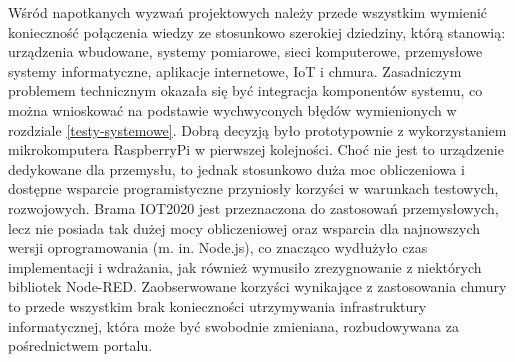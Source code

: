\documentclass[a4paper, 12pt, twoside]{article}
\begin{document}
Wśród napotkanych wyzwań projektowych należy przede wszystkim wymienić konieczność
połączenia wiedzy ze stosunkowo szerokiej dziedziny, którą stanowią: urządzenia wbudowane, 
systemy pomiarowe, sieci komputerowe, przemysłowe systemy informatyczne, aplikacje internetowe, IoT i chmura. 
Zasadniczym problemem technicznym okazała się być integracja komponentów systemu, co 
można wnioskować na podstawie wychwyconych błędów wymienionych w rozdziale 
\ref{testy-systemowe}. Dobrą decyzją było prototypownie z wykorzystaniem
mikrokomputera RaspberryPi w pierwszej kolejności. Choć nie jest to urządzenie 
dedykowane dla przemysłu, to jednak stosunkowo duża moc obliczeniowa i 
dostępne wsparcie programistyczne przyniosły korzyści w warunkach testowych, rozwojowych.
Brama IOT2020 jest przeznaczona do zastosowań przemysłowych, lecz nie posiada 
tak dużej mocy obliczeniowej oraz wsparcia dla najnowszych wersji oprogramowania (m. in. Node.js),
co znacząco wydłużyło czas implementacji i wdrażania, jak również wymusiło 
zrezygnowanie z niektórych bibliotek Node-RED. Zaobserwowane korzyści wynikające
z zastosowania chmury to przede wszystkim brak konieczności utrzymywania infrastruktury
informatycznej, która może być swobodnie zmieniana, rozbudowywana za pośrednictwem
portalu.  
\end{document}
